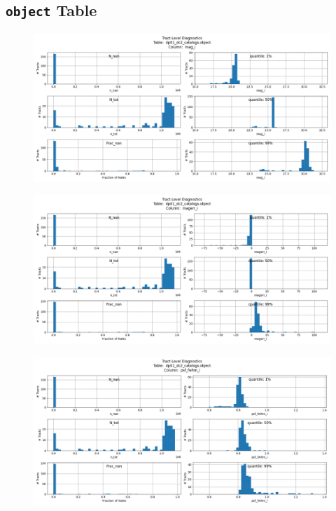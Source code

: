 \documentclass[DM,authoryear,toc]{lsstdoc}
\begin{document}
\subsection{\texttt{object} Table} \label{sec:object}

\begin{figure}[h]
\centering
\includegraphics[width=1.0\linewidth]{Plots/TAP_verify_DP01.dp01_dc2_catalogs.object.mag_i.png}
\caption{}
\label{fig:object_mag_i}
\end{figure}

\begin{figure}[h]
\centering
\includegraphics[width=1.0\linewidth]{Plots/TAP_verify_DP01.dp01_dc2_catalogs.object.magerr_i.png}
\caption{}
\label{fig:object_mag_i}
\end{figure}

\begin{figure}[h]
\centering
\includegraphics[width=1.0\linewidth]{Plots/TAP_verify_DP01.dp01_dc2_catalogs.object.psf_fwhm_i.png}
\caption{}
\label{fig:object_mag_i}
\end{figure}
\end{document}
